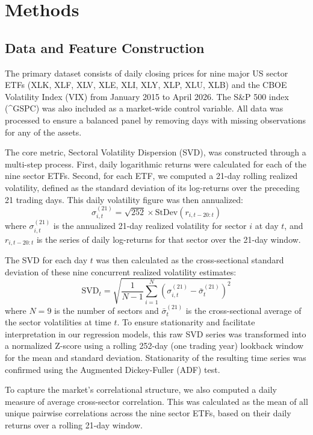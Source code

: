 \documentclass[]{article}
\begin{document}
\section{Methods}
\label{sec:methods}
\subsection{Data and Feature Construction}
The primary dataset consists of daily closing prices for nine major US sector ETFs (XLK, XLF, XLV, XLE, XLI, XLY, XLP, XLU, XLB) and the CBOE Volatility Index (VIX) from January 2015 to April 2026. The S\&P 500 index (\textasciicircum GSPC) was also included as a market-wide control variable. All data was processed to ensure a balanced panel by removing days with missing observations for any of the assets.

The core metric, Sectoral Volatility Dispersion (SVD), was constructed through a multi-step process. First, daily logarithmic returns were calculated for each of the nine sector ETFs. Second, for each ETF, we computed a 21-day rolling realized volatility, defined as the standard deviation of its log-returns over the preceding 21 trading days. This daily volatility figure was then annualized:
\begin{equation}
    \sigma_{i,t}^{(21)} = \sqrt{252} \times \text{StDev}(r_{i, t-20:t})
\end{equation}
where $\sigma_{i,t}^{(21)}$ is the annualized 21-day realized volatility for sector $i$ at day $t$, and $r_{i, t-20:t}$ is the series of daily log-returns for that sector over the 21-day window.

The SVD for each day $t$ was then calculated as the cross-sectional standard deviation of these nine concurrent realized volatility estimates:
\begin{equation}
    \text{SVD}_t = \sqrt{\frac{1}{N-1} \sum_{i=1}^{N} (\sigma_{i,t}^{(21)} - \bar{\sigma}_{t}^{(21)})^2}
\end{equation}
where $N=9$ is the number of sectors and $\bar{\sigma}_{t}^{(21)}$ is the cross-sectional average of the sector volatilities at time $t$. To ensure stationarity and facilitate interpretation in our regression models, this raw SVD series was transformed into a normalized Z-score using a rolling 252-day (one trading year) lookback window for the mean and standard deviation. Stationarity of the resulting time series was confirmed using the Augmented Dickey-Fuller (ADF) test.

To capture the market's correlational structure, we also computed a daily measure of average cross-sector correlation. This was calculated as the mean of all unique pairwise correlations across the nine sector ETFs, based on their daily returns over a rolling 21-day window.
\end{document}
